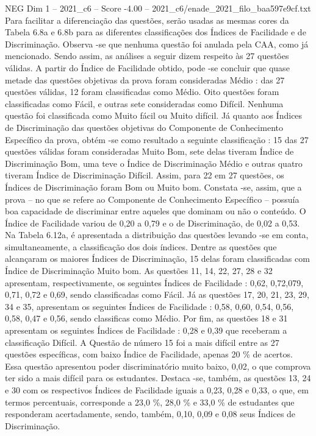\begin{textsample}{NEG Dim 1 – 2021\_c6 – Score -4.00 – 2021\_c6/enade\_2021\_filo\_baa597e9cf.txt}
Para facilitar a diferenciação das questões, serão usadas as mesmas cores da Tabela 6.8a e 6.8b para as diferentes classificações dos Índices de Facilidade e de Discriminação.
Observa -se que nenhuma questão foi anulada pela CAA, como já mencionado.
Sendo assim, as análises a seguir dizem respeito às 27 questões válidas.
A partir do Índice de Facilidade obtido, pode -se concluir que quase metade das questões objetivas da prova foram consideradas Médio : das 27 questões válidas, 12 foram classificadas como Médio.
Oito questões foram classificadas como Fácil, e outras sete consideradas como Difícil.
Nenhuma questão foi classificada como Muito fácil ou Muito difícil.
Já quanto aos Índices de Discriminação das questões objetivas do Componente de Conhecimento Específico da prova, obtém -se como resultado a seguinte classificação : 15 das 27 questões válidas foram consideradas Muito Bom, sete delas tiveram Índice de Discriminação Bom, uma teve o Índice de Discriminação Médio e outras quatro tiveram Índice de Discriminação Difícil.
Assim, para 22 em 27 questões, os Índices de Discriminação foram Bom ou Muito bom.
Constata -se, assim, que a prova – no que se refere ao Componente de Conhecimento Específico – possuía boa capacidade de discriminar entre aqueles que dominam ou não o conteúdo.
O Índice de Facilidade variou de 0,20 a 0,79 e o de Discriminação, de 0,02 a 0,53.
Na Tabela 6.12a, é apresentada a distribuição das questões levando -se em conta, simultaneamente, a classificação dos dois índices.
Dentre as questões que alcançaram os maiores Índices de Discriminação, 15 delas foram classificadas com Índice de Discriminação Muito bom.
As questões 11, 14, 22, 27, 28 e 32 apresentam, respectivamente, os seguintes Índices de Facilidade : 0,62, 0,72,079, 0,71, 0,72 e 0,69, sendo classificadas como Fácil.
Já as questões 17, 20, 21, 23, 29, 34 e 35, apresentam os seguintes Índices de Facilidade : 0,58, 0,60, 0,54, 0,56, 0,58, 0,47 e 0,56, sendo classificas como Médio.
Por fim, as questões 18 e 31 apresentam os seguintes Índices de Facilidade : 0,28 e 0,39 que receberam a classificação Difícil.
A Questão de número 15 foi a mais difícil entre as 27 questões específicas, com baixo Índice de Facilidade, apenas 20 \% de acertos.
Essa questão apresentou poder discriminatório muito baixo, 0,02, o que comprova ter sido a mais difícil para os estudantes.
Destaca -se, também, as questões 13, 24 e 30 com os respectivos Índices de Facilidade iguais a 0,23, 0,28 e 0,33, o que, em termos percentuais, corresponde a 23,0 \%, 28,0 \% e 33,0 \% de estudantes que responderam acertadamente, sendo, também, 0,10, 0,09 e 0,08 seus Índices de Discriminação.

\end{textsample}
